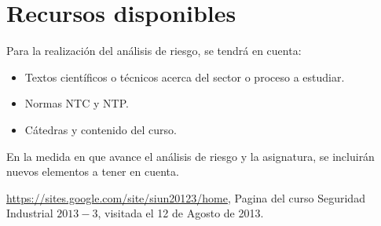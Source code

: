 \documentclass[11pt,graphicx,caption,rotating]{article}
\begin{document}
\section{Recursos disponibles}
Para la realización del análisis de riesgo, se tendrá en cuenta: \begin{itemize} 
  \item Textos científicos o técnicos acerca del sector o proceso a estudiar.
  \item Normas NTC y NTP.
  \item Cátedras y contenido del curso.
\end{itemize}
\noindent
En la medida en que avance el análisis de riesgo y la asignatura, se incluirán nuevos elementos a tener en cuenta.


\begin{thebibliography}{99}

 \url{https://sites.google.com/site/siun20123/home}, Pagina del curso Seguridad Industrial $2013-3$, visitada el 12 de Agosto de 2013.

\end{thebibliography}
\end{document}
